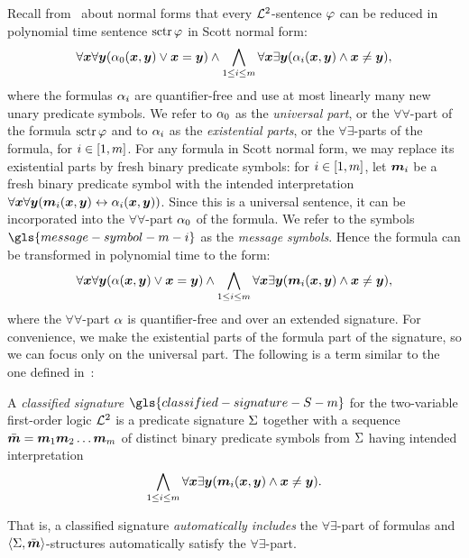 Recall from~ about normal forms that every $\mathcal{L}^{2}$-sentence
$\varphi$ can be reduced in polynomial time sentence $\operatorname{sctr}\varphi$ in Scott normal
form:
\[
  \forall\bm{x}\forall\bm{y} (\alpha_{0}(\bm{x},\bm{y}) \lor \bm{x} = \bm{y}) \land
  \bigwedge_{1 \leq i \leq m} \forall\bm{x}\exists\bm{y}(
  \alpha_{i}(\bm{x},\bm{y}) \land \bm{x} \neq \bm{y}),
\]
where the formulas $\alpha_{i}$ are quantifier-free and use at most linearly many
new unary predicate symbols. We refer to $\alpha_{0}$ as the \emph{universal part},
or the $\forall\forall$-part of the formula $\operatorname{sctr}\varphi$ and to $\alpha_{i}$ as
the \emph{existential parts}, or the $\forall\exists$-parts of the formula,
for $i \in [1,m]$.
For any formula in Scott normal form, we may replace its existential parts
by fresh binary predicate symbols: for $i \in [1,m]$, let $\bm{m}_{i}$ be a
fresh binary predicate symbol with the intended interpretation
$\forall\bm{x}\forall\bm{y} (\bm{m}_{i}(\bm{x},\bm{y}) \leftrightarrow \alpha_{i}(\bm{x},\bm{y}))$.
Since this is a universal sentence, it can be incorporated into the
$\forall\forall$-part $\alpha_{0}$ of the formula.
We refer to the symbols $\gls{message-symbol-m-i}$ as the \emph{message
symbols}.
Hence the formula can be transformed in polynomial time to the form:
\begin{equation}\label{eq:twovar-msg-nf}
  \forall\bm{x}\forall\bm{y} (\alpha(\bm{x},\bm{y}) \lor \bm{x} = \bm{y}) \land
  \bigwedge_{1 \leq i \leq m} \forall\bm{x}\exists\bm{y}
  (\bm{m}_{i}(\bm{x},\bm{y}) \land \bm{x} \neq \bm{y}),
\end{equation}
where the $\forall\forall$-part $\alpha$ is quantifier-free and over an extended
signature. For convenience, we make the existential parts of the formula part of
the signature, so we can focus only on the universal part. The following is a
term similar to the one defined in~\cite{MALQ:MALQ201400102}:
\begin{definition}
A \emph{classified signature} $\gls{classified-signature-S-m}$ for the
two-variable first-order logic $\mathcal{L}^{2}$ is a predicate signature $\mathrm{\Sigma}$ together
with a sequence $\sms = \smm1\smm2\dots\smm\nm$ of distinct binary predicate
symbols from $\mathrm{\Sigma}$ having intended interpretation
\begin{equation}\label{eq:twovar-ms-iinter}
  \bigwedge_{1 \leq i \leq m} \forall\bm{x}\exists\bm{y} 
  (\bm{m}_{i}(\bm{x},\bm{y}) \land \bm{x} \neq \bm{y}).
\end{equation}
\end{definition}
That is, a classified signature \emph{automatically includes} the
$\forall\exists$-part of formulas and $\left\langle \mathrm{\Sigma},\bar{\bm{m}} \right\rangle$-structures
automatically satisfy the $\forall\exists$-part.

